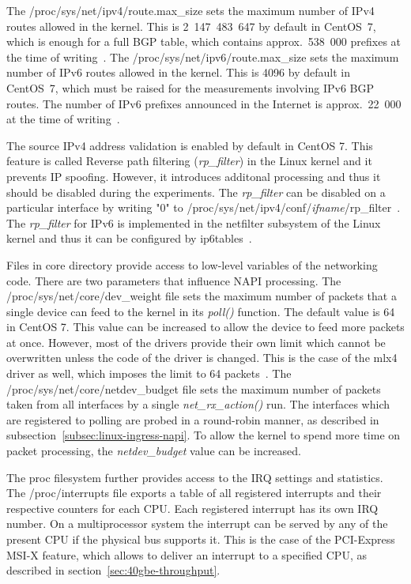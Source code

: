 The /proc/sys/net/ipv4/route.max\_size sets the maximum number of IPv4 routes allowed in the kernel.
This is 2~147~483~647 by default in CentOS~7, which is enough for a full BGP table,
which contains approx.~538~000 prefixes at the time of writing~\cite{bgp-analysis-reports}.
The /proc/sys/net/ipv6/route.max\_size sets the maximum number of IPv6 routes allowed in the kernel.
This is 4096 by default in CentOS~7, which must be raised for the measurements involving IPv6 BGP routes.
The number of IPv6 prefixes announced in the Internet is approx.~22~000 at the time of writing~\cite{bgp-analysis-reports}.

The source IPv4 address validation is enabled by default in CentOS 7.
This feature is called Reverse path filtering ({\it{rp\_filter}}) in the Linux kernel and it prevents IP spoofing.
However, it introduces additonal processing and thus it should be disabled during the experiments.
The {\it{rp\_filter}} can be disabled on a particular interface
by writing "0" to /proc/sys/net/ipv4/conf/{\it{ifname}}/rp\_filter~\cite{kernel-doc-ip-sysctl}.
The {\it{rp\_filter}} for IPv6 is implemented in the netfilter subsystem of the Linux kernel and
thus it can be configured by ip6tables~\cite{kernel-source}.

Files in core directory provide access to low-level variables of the networking code.
There are two parameters that influence NAPI processing.
The /proc/sys/net/core/dev\_weight file sets the maximum number of packets that a single device
can feed to the kernel in its {\it{poll()}} function.
The default value is 64 in CentOS 7.
This value can be increased to allow the device to feed more packets at once.
However, most of the drivers provide their own limit which cannot be overwritten unless the code of the driver is changed.
This is the case of the mlx4 driver as well, which imposes the limit to 64 packets~\cite{kernel-source}.
The /proc/sys/net/core/netdev\_budget file sets the
maximum number of packets taken from all interfaces by a single {\it{net\_rx\_action()}} run.
The interfaces which are registered to polling are
probed in a round-robin manner, as described in subsection~\ref{subsec:linux-ingress-napi}.
To allow the kernel to spend more time on packet processing, the {\it{netdev\_budget}} value can be increased.

The proc filesystem further provides access to the IRQ settings and statistics.
The /proc/interrupts file exports a table of all registered interrupts and their respective counters for each CPU.
Each registered interrupt has its own IRQ number.
On a multiprocessor system the interrupt can be served by any of the present CPU if the physical bus supports it.
This is the case of the PCI-Express MSI-X feature, which allows to deliver an interrupt to a specified CPU,
as described in section~\ref{sec:40gbe-throughput}.

